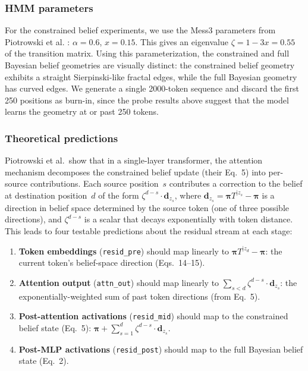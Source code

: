 \documentclass[midterm]{sparreport}
\begin{document}
\subsubsection{HMM parameters}
For the constrained belief experiments, we use the Mess3 parameters from Piotrowski et al. \cite{piotrowski2025constrained}: $\alpha = 0.6$, $x = 0.15$. This gives an eigenvalue $\zeta = 1 - 3x = 0.55$ of the transition matrix. Using this parameterization, the constrained and full Bayesian belief geometries are visually distinct: the constrained belief geometry exhibits a straight Sierpinski-like fractal edges, while the full Bayesian geometry has curved edges. We generate a single 2000-token sequence and discard the first 250 positions as burn-in, since the probe results above suggest that the model learns the geometry at or past 250 tokens.

\subsubsection{Theoretical predictions}
\label{sec:constrained_theory}
Piotrowski et al.\ show that in a single-layer transformer, the attention mechanism decomposes the constrained belief update (their Eq.~5) into per-source contributions. Each source position~$s$ contributes a correction to the belief at destination position~$d$ of the form $\zeta^{d-s} \cdot \mathbf{d}_{z_s}$, where $\mathbf{d}_{z_s} = \boldsymbol{\pi} T^{|z_s} - \boldsymbol{\pi}$ is a direction in belief space determined by the source token (one of three possible directions), and $\zeta^{d-s}$ is a scalar that decays exponentially with token distance. This leads to four testable predictions about the residual stream at each stage:
\begin{enumerate}
\item \textbf{Token embeddings} (\texttt{resid\_pre}) should map linearly to $\boldsymbol{\pi} T^{|z_d} - \boldsymbol{\pi}$: the current token's belief-space direction (Eqs.~14--15).
\item \textbf{Attention output} (\texttt{attn\_out}) should map linearly to $\sum_{s < d} \zeta^{d-s} \cdot \mathbf{d}_{z_s}$: the exponentially-weighted sum of past token directions (from Eq.~5).
\item \textbf{Post-attention activations} (\texttt{resid\_mid}) should map to the constrained belief state (Eq.~5): $\boldsymbol{\pi} + \sum_{s=1}^{d} \zeta^{d-s} \cdot \mathbf{d}_{z_s}$.
\item \textbf{Post-MLP activations} (\texttt{resid\_post}) should map to the full Bayesian belief state (Eq.~2).
\end{enumerate}
\end{document}
